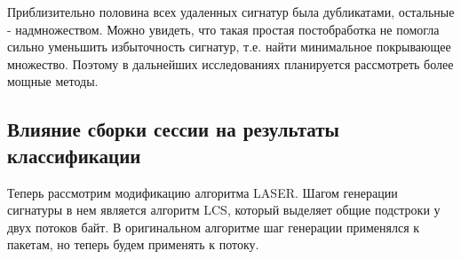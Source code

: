 \begin{table}[ht!]
    \caption{Количество сигнатур после постобработки.}
    \label{post-processing}
    \centering
\end{table}

Приблизительно половина всех удаленных сигнатур была дубликатами, остальные - надмножеством.
Можно увидеть, что такая простая постобработка не помогла сильно уменьшить избыточность сигнатур, т.е. найти минимальное покрывающее множество.
Поэтому в дальнейших исследованиях планируется рассмотреть более мощные методы.

\subsection{Влияние сборки сессии на результаты классификации}

Теперь рассмотрим модификацию алгоритма LASER. Шагом генерации сигнатуры в нем является алгоритм LCS, который выделяет общие подстроки у двух потоков байт.
В оригинальном алгоритме шаг генерации применялся к пакетам, но теперь будем применять к потоку.

